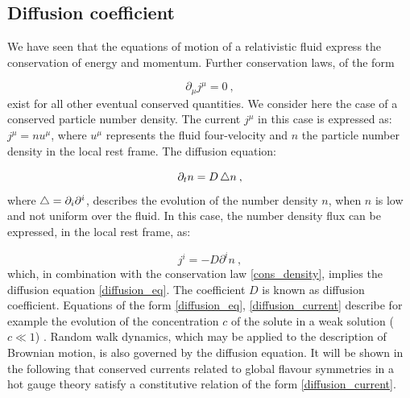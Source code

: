  \subsection{Diffusion coefficient}
 
We have seen that the equations of motion of a relativistic fluid express the conservation of energy and momentum. Further conservation laws, of the form
 
 \begin{equation}
 \partial_{\mu} j^{\mu} = 0 \: ,
 \label{cons_density}
 \end{equation}
 exist for all other eventual conserved quantities. We consider here the case of a conserved particle number density. The current $j^{\mu}$ in this case is expressed as: $j^{\mu} = n  u^{\mu}$, where $u^{\mu}$ represents the fluid four-velocity and $n$ the particle number density in the local rest frame. The diffusion equation:
 
 \begin{equation}
 \partial_t n = D \mathop{}\!\mathbin\bigtriangleup n \: ,
 \label{diffusion_eq}
 \end{equation}
 where $\mathop{}\!\mathbin\bigtriangleup = \partial_i \partial^i$, describes the evolution of the number density $n$, when $n$ is low and not uniform over the fluid. In this case, the number density flux can be expressed, in the local rest frame, as:
 
\begin{equation}
j^i = - D \partial^i n \: ,
\label{diffusion_current}
\end{equation}
%
which, in combination with the conservation law \ref{cons_density}, implies the diffusion equation \ref{diffusion_eq}. The coefficient $D$ is known as diffusion coefficient. Equations of the form \ref{diffusion_eq}, \ref{diffusion_current} describe for example the evolution of the concentration $c$ of the solute in a weak solution ($c \ll 1$) \cite{landau2013fluid}. Random walk dynamics, which may be applied to the description of Brownian motion, is also governed by the diffusion equation. It will be shown in the following that conserved currents related to global flavour symmetries in a hot gauge theory satisfy a constitutive relation of the form \ref{diffusion_current}. 



